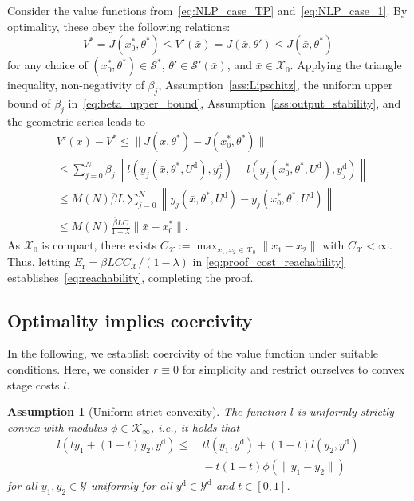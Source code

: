 \documentclass[a4paper,fleqn]{cas-dc}
\newtheorem{ass}{Assumption}
\begin{document}
\begin{pf}	
	Consider the value functions from~\eqref{eq:NLP_case_TP} and~\eqref{eq:NLP_case_1}. By optimality, these obey the following relations:
	\begin{equation}\label{eq:proof_optimality}
		V^* = J(x_0^*,\theta^*) \leq V'(\bar{x}) = J(\bar{x},\theta') \leq J(\bar{x},\theta^*)
	\end{equation}
	for any choice of $(x_0^*,\theta^*)\in\mathcal{S}^*$, $\theta'\in\mathcal{S}'(\bar{x})$, and $\bar{x}\in\mathcal{X}_0$.
	Applying the triangle inequality, non-negativity of $\beta_j$, Assumption~\ref{ass:Lipschitz}, the uniform upper bound of $\beta_j$ in~\eqref{eq:beta_upper_bound}, Assumption~\ref{ass:output_stability}, and the geometric series leads to
	\begin{align}
		&V'(\bar{x}) - V^* \leq \|J(\bar{x},\theta^*) - J(x_0^*,\theta^*)\|\nonumber\\
		&\leq  \sum_{j=0}^N \beta_j\left\| l({y}_j(\bar{x},\theta^*,U^\mathrm{d}),{y}_{j}^\mathrm{d}) - l({y}_j(x_0^*,\theta^*,U^\mathrm{d}),{y}_{j}^\mathrm{d}) \right\|\nonumber\\
		&\leq M(N)\overline{\beta} L  \sum_{j=0}^N \left\|{y}_j(\bar{x},\theta^*,U^\mathrm{d})-{y}_j(x_0^*,\theta^*,U^\mathrm{d})\right\|\nonumber\\
		&\leq M(N) \frac{\overline{\beta}LC}{1-\lambda} \|\bar{x}-x_0^*\|. \label{eq:proof_cost_reachability}
	\end{align}
	As $\mathcal{X}_0$ is compact, there exists $C_\mathcal{X} := \max_{x_1,x_2\in\mathcal{X}_0}\|x_1-x_2\|$ with $C_\mathcal{X}<\infty$. Thus, letting $E_\mathrm{r} = \overline{\beta}{LCC_\mathcal{X}}{/(1-\lambda)}$ in \eqref{eq:proof_cost_reachability} establishes~\eqref{eq:reachability}, completing the proof.
\end{pf}



\subsection{Optimality implies coercivity}\label{sec:coerc}


In the following, we establish coercivity of the value function under suitable conditions.
Here, we consider $r\equiv0$ for simplicity and restrict ourselves to convex stage costs $l$.

\begin{ass}[Uniform strict convexity]\label{ass:convex_lr}
	The function $l$ is uniformly strictly convex with modulus $\phi\in\mathcal{K}_\infty$, i.e., it holds that
	\begin{equation*}
		\begin{split}
			l(ty_1+(1-t)y_2,y^\mathrm{d})
			\leq&\ tl(y_1,y^\mathrm{d})+(1-t)l(y_2,y^\mathrm{d})\nonumber\\
			&\ -t(1-t)\phi(\|y_1-y_2\|)
		\end{split}
	\end{equation*}
	for all $y_1,y_2\in\mathcal{Y}$ uniformly for all $y^\mathrm{d}\in\mathcal{Y}^\mathrm{d}$ and $t\in[0,1]$.
\end{ass}
\end{document}
